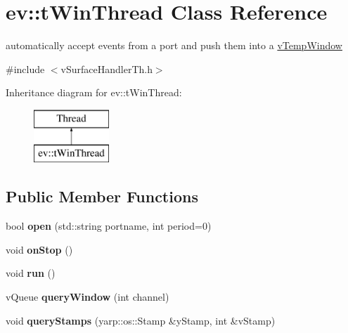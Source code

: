 \hypertarget{classev_1_1tWinThread}{}\section{ev\+:\+:t\+Win\+Thread Class Reference}
\label{classev_1_1tWinThread}


automatically accept events from a port and push them into a \hyperlink{classev_1_1vTempWindow}{v\+Temp\+Window}  




{\ttfamily \#include $<$v\+Surface\+Handler\+Th.\+h$>$}

Inheritance diagram for ev\+:\+:t\+Win\+Thread\+:\begin{figure}[H]
\begin{center}
\leavevmode
\includegraphics[height=2.000000cm]{classev_1_1tWinThread}
\end{center}
\end{figure}
\subsection*{Public Member Functions}
\begin{DoxyCompactItemize}
\item 
bool {\bfseries open} (std\+::string portname, int period=0)\hypertarget{classev_1_1tWinThread_a1edd593d8901ca970a51bfeb09181234}{}\label{classev_1_1tWinThread_a1edd593d8901ca970a51bfeb09181234}

\item 
void {\bfseries on\+Stop} ()\hypertarget{classev_1_1tWinThread_ab12b04cd804ac7f6d2f6a199bb2078a8}{}\label{classev_1_1tWinThread_ab12b04cd804ac7f6d2f6a199bb2078a8}

\item 
void {\bfseries run} ()\hypertarget{classev_1_1tWinThread_a6992dcf7884d08d7296e4489ef264959}{}\label{classev_1_1tWinThread_a6992dcf7884d08d7296e4489ef264959}

\item 
v\+Queue {\bfseries query\+Window} (int channel)\hypertarget{classev_1_1tWinThread_a6937e3d587982b4ecbc8e776c89b5ea1}{}\label{classev_1_1tWinThread_a6937e3d587982b4ecbc8e776c89b5ea1}

\item 
void {\bfseries query\+Stamps} (yarp\+::os\+::\+Stamp \&y\+Stamp, int \&v\+Stamp)\hypertarget{classev_1_1tWinThread_a346e943bc1a1e06210deb6da26fa18f6}{}\label{classev_1_1tWinThread_a346e943bc1a1e06210deb6da26fa18f6}

\end{DoxyCompactItemize}


